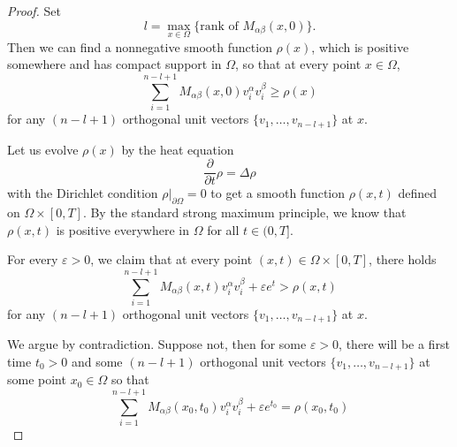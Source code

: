 \begin{proof}
Set
$$
l=\max_{x\in \Omega}\{\text{rank of } M_{\alpha\beta}(x,0)\}.
$$
Then we can find a nonnegative smooth function $\rho(x)$, which is
positive somewhere and has compact support in $\Omega$, so that at
every point $x \in \Omega$,
$$
\sum^{n-l+1}_{i=1}M_{\alpha\beta}(x,0)v^{\alpha}_{i}v^{\beta}_{i}
\geq \rho(x)
$$
for any $(n-l+1)$ orthogonal unit vectors $\{ v_1, \ldots,
v_{n-l+1} \}$ at $x$.

Let us evolve $\rho(x)$ by the heat equation
$$
\frac{\partial}{\partial t}\rho=\Delta\rho
$$
with the Dirichlet condition $\rho|_{\partial \Omega}=0$ to get a
smooth function $\rho(x,t)$ defined on $\Omega \times [0,T]$. By
the standard strong maximum principle, we know that $\rho(x,t)$ is
positive everywhere in $\Omega$ for all $t\in (0,T]$.

For every $\varepsilon>0$, we claim that at every point $(x,t) \in
\Omega \times [0,T]$, there holds
$$
\sum^{n-l+1}_{i=1}M_{\alpha\beta}(x,t)v^{\alpha}_{i}v^{\beta}_{i}
 + \varepsilon e^t > \rho(x,t)
$$
for any $(n-l+1)$ orthogonal unit vectors $\{ v_1, \ldots,
v_{n-l+1} \}$ at $x$.

We argue by contradiction. Suppose not, then for some
$\varepsilon>0$, there will be a first time $t_0 > 0$ and some
$(n-l+1)$ orthogonal unit vectors $\{ v_1, \ldots, v_{n-l+1} \}$
at some point $x_0 \in \Omega$ so that
$$
\sum^{n-l+1}_{i=1}M_{\alpha\beta}(x_0,t_0)v^{\alpha}_{i}v^{\beta}_{i}
 + \varepsilon e^{t_0} = \rho(x_0,t_0)
$$


\end{proof}
